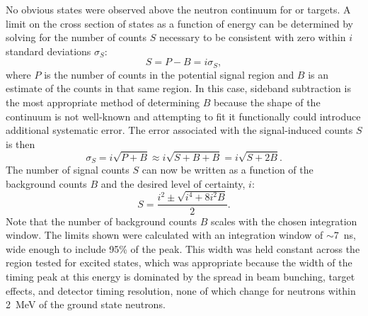 No obvious \zp states were observed above the neutron continuum for  or  targets.  A limit on the cross section of \zp states as a function of energy can be determined by solving for the number of counts $S$ necessary to be consistent with zero within $i$ standard deviations $\sigma_S$:
\begin{equation}
S = P - B = i\sigma_S,
\end{equation}
where $P$ is the number of counts in the potential signal region and $B$ is an estimate of the counts in that same region.  In this case, sideband subtraction is the most appropriate method of determining $B$ because the shape of the continuum is not well-known and attempting to fit it functionally could introduce additional systematic error.  The error associated with the signal-induced counts $S$ is then
\begin{equation}
\sigma_S = i\sqrt{P+B} \approx i\sqrt{S+B+B} = i\sqrt{S+2B}.
\end{equation}
The number of signal counts $S$ can now be written as a function of the background counts $B$ and the desired level of certainty, $i$:
\begin{equation}
S = \frac{i^2 \pm \sqrt{i^4 + 8i^2B}}{2}.
\end{equation}
Note that the number of background counts $B$ scales with the chosen integration window.  The limits shown were calculated with an integration window of $\sim$7~ns, wide enough to include 95\% of the peak.  This width was held constant across the region tested for excited \zp states, which was appropriate because the width of the timing peak at this energy is dominated by the spread in beam bunching, target effects, and detector timing resolution, none of which change for neutrons within 2~MeV of the ground state neutrons.

